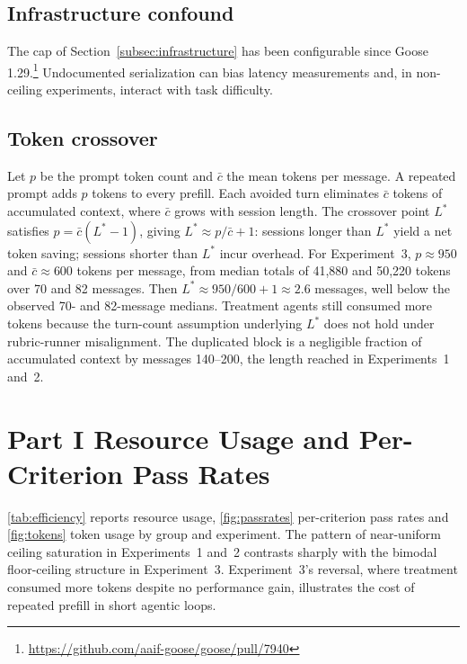 \documentclass[11pt,a4paper]{article}
\begin{document}
\subsection{Infrastructure confound}

The cap of Section~\ref{subsec:infrastructure} has been configurable since Goose 1.29.\footnote{\url{https://github.com/aaif-goose/goose/pull/7940}}
Undocumented serialization can bias latency measurements and, in non-ceiling experiments, interact with task difficulty.

\subsection{Token crossover}

Let $p$ be the prompt token count and $\bar{c}$ the mean tokens per message.
A repeated prompt adds $p$ tokens to every prefill.
Each avoided turn eliminates $\bar{c}$ tokens of accumulated context, where $\bar{c}$ grows with session length.
The crossover point $L^*$ satisfies $p = \bar{c}(L^* - 1)$, giving $L^* \approx p/\bar{c} + 1$: sessions longer than $L^*$ yield a net token saving; sessions shorter than $L^*$ incur overhead.
For Experiment~3, $p \approx 950$ and $\bar{c} \approx 600$ tokens per message, from median totals of 41{,}880 and 50{,}220 tokens over 70 and 82 messages.
Then $L^* \approx 950/600 + 1 \approx 2.6$ messages, well below the observed 70- and 82-message medians.
Treatment agents still consumed more tokens because the turn-count assumption underlying $L^*$ does not hold under rubric-runner misalignment.
The duplicated block is a negligible fraction of accumulated context by messages 140--200, the length reached in Experiments~1 and~2.

\section{Part I Resource Usage and Per-Criterion Pass Rates}
\label{app:part1resources}

\autoref{tab:efficiency} reports resource usage, \autoref{fig:passrates} per-criterion pass rates and \autoref{fig:tokens} token usage by group and experiment.
The pattern of near-uniform ceiling saturation in Experiments~1 and~2 contrasts sharply with the bimodal floor-ceiling structure in Experiment~3.
Experiment~3's reversal, where treatment consumed more tokens despite no performance gain, illustrates the cost of repeated prefill in short agentic loops.
\end{document}
